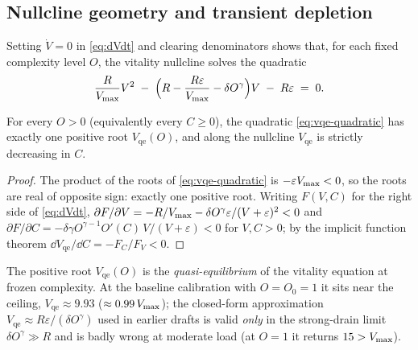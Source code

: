 \subsection{Nullcline geometry and transient depletion}
\label{sec:transient}

Setting $\dot V=0$ in \eqref{eq:dVdt} and clearing denominators shows that,
for each fixed complexity level $O$, the vitality nullcline solves the
quadratic
\begin{equation}
\label{eq:vqe-quadratic}
\frac{R}{V_{\max}}V^{2}
\;-\;\Bigl(R-\frac{R\varepsilon}{V_{\max}}-\delta O^{\gamma}\Bigr)V
\;-\;R\varepsilon \;=\;0 .
\end{equation}

\begin{proposition}
\label{prop:nullcline}
For every $O>0$ (equivalently every $C\ge0$), the quadratic
\eqref{eq:vqe-quadratic} has exactly one positive root $V_{\mathrm{qe}}(O)$,
and along the nullcline $V_{\mathrm{qe}}$ is strictly decreasing in $C$.
\end{proposition}

\begin{proof}
The product of the roots of \eqref{eq:vqe-quadratic} is
$-\varepsilon V_{\max}<0$, so the roots are real of opposite sign: exactly one
positive root. Writing $F(V,C)$ for the right side of \eqref{eq:dVdt},
$\partial F/\partial V = -R/V_{\max} - \delta O^{\gamma}\varepsilon/(V+\varepsilon)^{2}<0$
and
$\partial F/\partial C = -\delta\gamma O^{\gamma-1}O'(C)\,V/(V+\varepsilon)<0$
for $V,C>0$; by the implicit function theorem
$\dd V_{\mathrm{qe}}/\dd C = -F_C/F_V<0$.
\end{proof}

The positive root $V_{\mathrm{qe}}(O)$ is the \emph{quasi-equilibrium} of the
vitality equation at frozen complexity. At the baseline calibration with
$O=O_0=1$ it sits near the ceiling, $V_{\mathrm{qe}}\approx 9.93$
($\approx0.99\,V_{\max}$); the closed-form approximation
$V_{\mathrm{qe}}\approx R\varepsilon/(\delta O^{\gamma})$ used in earlier
drafts is valid \emph{only} in the strong-drain limit
$\delta O^{\gamma}\gg R$ and is badly wrong at moderate load (at $O=1$ it
returns $15>V_{\max}$).

